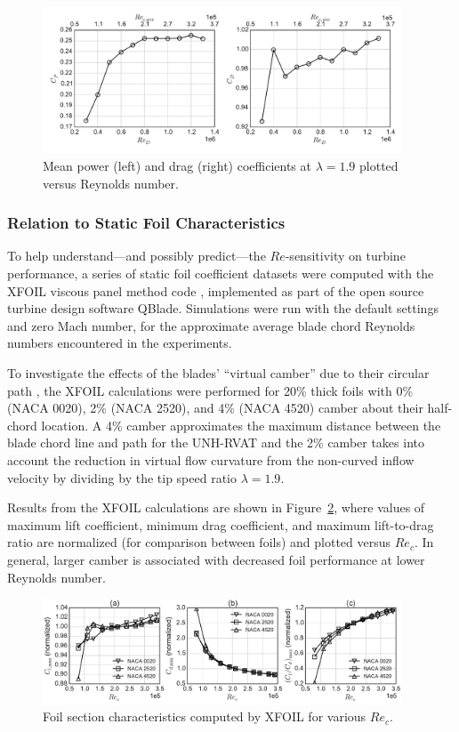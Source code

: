 \documentclass[energies,article,accept,moreauthors,pdftex,12pt,a4paper]{mdpi}
\begin{document}
\begin{figure}[ht]
\includegraphics[width=0.95\textwidth]{figures/perf_re_dep}
\caption{Mean power (left) and drag (right) coefficients at $\lambda=1.9$
plotted versus Reynolds number.} 
\label{fig:perf-Re-dep}
\end{figure}

\subsubsection{Relation to Static Foil Characteristics}

To help understand---and possibly predict---the $Re$-sensitivity on turbine
performance, a series of static foil coefficient datasets were computed with the
XFOIL viscous panel method code \cite{Drela1989}, implemented as part of the
open source turbine design software QBlade. Simulations were run with the
default settings and zero Mach number, for the approximate average blade chord
Reynolds numbers encountered in the experiments.

To investigate the effects of the blades' ``virtual camber'' due to their
circular path \cite{Migliore1980}, the XFOIL calculations were performed for
20\% thick foils with 0\% (NACA 0020), 2\% (NACA 2520), and 4\% (NACA 4520)
camber about their half-chord location. A 4\% camber approximates the maximum
distance between the blade chord line and path for the UNH-RVAT and the 2\%
camber takes into account the reduction in virtual flow curvature from the
non-curved inflow velocity by dividing by the tip speed ratio $\lambda=1.9$.

Results from the XFOIL calculations are shown in Figure~\ref{fig:foil-Re-dep},
where values of maximum lift coefficient, minimum drag coefficient, and maximum
lift-to-drag ratio are normalized (for comparison between foils) and plotted
versus $Re_c$. In general, larger camber is associated with decreased foil
performance at lower Reynolds number.

\begin{figure}[ht!]
\centering
\includegraphics[width=0.95\textwidth]{figures/all_foils_re_dep}
\caption{Foil section characteristics computed by XFOIL for various $Re_c$.}
\label{fig:foil-Re-dep}
\end{figure}
\end{document}
